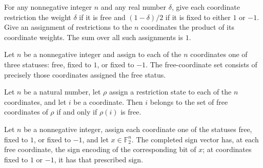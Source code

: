 \begin{theorem}
\label{FABL.sum_restrictionAssignmentWeightAt}
\leanok
{}
For any nonnegative integer $n$ and any real number $\delta$, give each coordinate
restriction the weight $\delta$ if it is free and $(1-\delta)/2$ if it is fixed to
either $1$ or $-1$. Give an assignment of restrictions to the $n$ coordinates the
product of its coordinate weights. The sum over all such assignments is $1$.
\end{theorem}

\begin{definition}
\label{FABL.CoordRestriction.freeCoordinates}
\leanok
{}
Let $n$ be a nonnegative integer and assign to each of the $n$ coordinates one of three
statuses: free, fixed to $1$, or fixed to $-1$. The free-coordinate set consists of
precisely those coordinates assigned the free status.
\end{definition}

\begin{theorem}
\label{FABL.CoordRestriction.mem_freeCoordinates_iff}
\leanok
{}
Let $n$ be a natural number, let $\rho$ assign a restriction state to each of the $n$
coordinates, and let $i$ be a coordinate. Then $i$ belongs to the set of free
coordinates of $\rho$ if and only if $\rho(i)$ is free.
\end{theorem}

\begin{definition}
\label{FABL.CoordRestriction.complete}
\leanok
{}
Let $n$ be a nonnegative integer, assign each coordinate one of the statuses free, fixed
to $1$, or fixed to $-1$, and let $x\in\mathbb F_2^n$. The completed sign vector has,
at each free coordinate, the sign encoding of the corresponding bit of $x$; at
coordinates fixed to $1$ or $-1$, it has that prescribed sign.
\end{definition}


